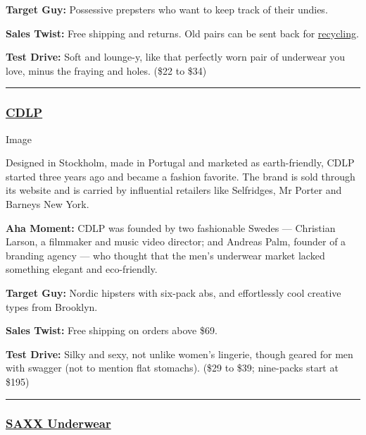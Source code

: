 \textbf{Target Guy:} Possessive prepsters who want to keep track of
their undies.

\textbf{Sales Twist:} Free shipping and returns. Old pairs can be sent
back for
\href{https://www.nicelaundry.com/pages/refresh-recycle}{recycling}.

\textbf{Test Drive:} Soft and lounge-y, like that perfectly worn pair of
underwear you love, minus the fraying and holes. (\$22 to \$34)

\begin{center}\rule{0.5\linewidth}{\linethickness}\end{center}

\hypertarget{cdlp}{%
\subsubsection{\texorpdfstring{\textbf{\href{https://cdlp.com/}{CDLP}}}{CDLP}}\label{cdlp}}

Image

Designed in Stockholm, made in Portugal and marketed as earth-friendly,
CDLP started three years ago and became a fashion favorite. The brand is
sold through its website and is carried by influential retailers like
Selfridges, Mr Porter and Barneys New York.

\textbf{Aha Moment:} CDLP was founded by two fashionable Swedes ---
Christian Larson, a filmmaker and music video director; and Andreas
Palm, founder of a branding agency --- who thought that the men's
underwear market lacked something elegant and eco-friendly.

\textbf{Target Guy:} Nordic hipsters with six-pack abs, and effortlessly
cool creative types from Brooklyn.

\textbf{Sales Twist:} Free shipping on orders above \$69.

\textbf{Test Drive:} Silky and sexy, not unlike women's lingerie, though
geared for men with swagger (not to mention flat stomachs). (\$29 to
\$39; nine-packs start at \$195)

\begin{center}\rule{0.5\linewidth}{\linethickness}\end{center}

\hypertarget{saxx-underwear}{%
\subsubsection{\texorpdfstring{\textbf{\href{https://www.saxxunderwear.com/}{SAXX
Underwear}}}{SAXX Underwear}}\label{saxx-underwear}}

